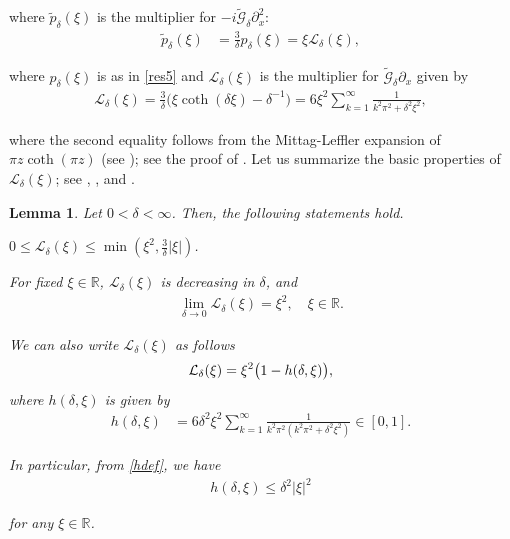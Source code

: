 \documentclass[letterpaper, 11pt,  reqno]{amsart}
\newtheorem{lemma}[theorem]{Lemma}
\newcommand{\1}{\hspace{0.5mm}\textup{I}\hspace{0.5mm}}
\newcommand{\noi}{\noindent}
\newcommand{\Z}{\mathbb{Z}}
\newcommand{\R}{\mathbb{R}}
\renewcommand{\L}{\mathcal{L}}
\newcommand{\dl}{\delta}
\newcommand{\wt}{\widetilde}
\newcommand{\dx}{\partial_x}
\newcommand{\Gd}{\wt{\mathcal{G}}_\dl}
\numberwithin{equation}{section}
\numberwithin{theorem}{section}
\begin{document}
\noi
where 
$\wt p_\dl(\xi)$
is the 
 multiplier  for $-i\Gd \dx^2$:
 \begin{align}
\wt p_\dl(\xi)
&  =   \frac 3 \dl p_\dl(\xi) 
= \xi \L_\dl(\xi),  %
\label{res10}
\end{align}


\noi
where $p_\dl(\xi)$ is as in \eqref{res5}
and  
$\L_\dl(\xi) $ is the multiplier for  $\Gd\dx$ given by
\begin{align}
\L_\dl(\xi)
=  \tfrac 3\dl \big( \xi \coth(\dl \xi) - \dl^{-1}\big)
= 6 \xi^2 \sum_{k=1}^\infty \frac{1}{k^2 \pi^2 + \dl^2 \xi^2}, 
\label{res11}
\end{align}

\noi
where the second equality follows
from 
the Mittag-Leffler expansion
of 
$\pi z \coth (\pi z)$ (see \cite[(11) on p.\,189]{Ahl});
see the proof of 
\cite[Lemma 2.3]{LOZ}.
Let us summarize the basic properties
of $\L_\dl(\xi)$;
see \cite[Lemma 8.2.1]{ABFS}, 
\cite[(the proof of) Lemma 2.3]{LOZ}, 
and \cite[Lemma 2.3]{CLO}.




\begin{lemma}\label{LEM:multip}
Let $0< \dl< \infty$. Then, the following statements hold.


\smallskip
\noi{\rm(i)} $0 \le \L_\dl(\xi) \le \min( \xi^2, \tfrac3\dl |\xi| )$.

\smallskip
\noi{\rm(ii)} For fixed $\xi \in \R$, $\L_\dl(\xi)$ is decreasing in $\dl$, and 
\begin{align}
\lim_{\dl\to 0} \L_\dl(\xi) = \xi^2, \quad \xi  \in \R.
\label{res12}
\end{align}


\smallskip
\noi{\rm(iii)} We can also write $\L_\dl(\xi)$ as follows
\begin{align}
\notag
\L_\dl(\xi) 
=  \xi^2 \big( 1 - h(\dl, \xi) \big), 
\end{align}
where $h(\dl, \xi)$ is given by 
\begin{align}
\label{hdef}
h(\dl, \xi)
&
= 6 \dl^2 \xi^2 \sum_{k=1}^\infty \frac{1}{k^2 \pi^2 (k^2 \pi^2 + \dl^2 \xi^2)} \in [0,1].
\end{align}


\noi
In particular, from 
 \eqref{hdef}, we have 
\begin{align}
h(\dl, \xi)  \le \dl^2 |\xi|^2
\label{L3}
\end{align}

\noi
for any $\xi \in \R$.


%



\end{lemma}
\end{document}
